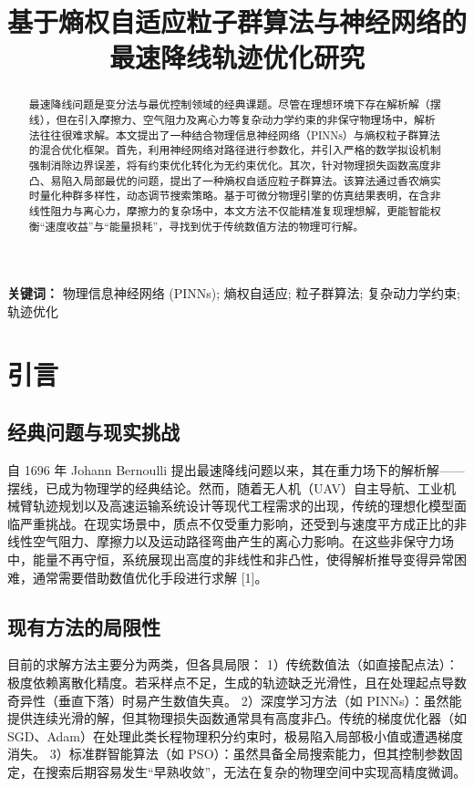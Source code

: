 \documentclass[twocolumn, UTF8, a4paper]{ctexart}
\title{\xiaosi \bfseries 基于熵权自适应粒子群算法与神经网络的最速降线轨迹优化研究}
\author{}
\date{}
\begin{document}
	
	\maketitle
	
	\begin{abstract}
		最速降线问题是变分法与最优控制领域的经典课题。尽管在理想环境下存在解析解（摆线），但在引入摩擦力、空气阻力及离心力等复杂动力学约束的非保守物理场中，解析法往往很难求解。本文提出了一种结合物理信息神经网络（PINNs）与熵权粒子群算法的混合优化框架。首先，利用神经网络对路径进行参数化，并引入严格的数学拟设机制强制消除边界误差，将有约束优化转化为无约束优化。其次，针对物理损失函数高度非凸、易陷入局部最优的问题，提出了一种熵权自适应粒子群算法。该算法通过香农熵实时量化种群多样性，动态调节搜索策略。基于可微分物理引擎的仿真结果表明，在含非线性阻力与离心力，摩擦力的复杂场中，本文方法不仅能精准复现理想解，更能智能权衡“速度收益”与“能量损耗”，寻找到优于传统数值方法的物理可行解。
	\end{abstract}
	
	\noindent \textbf{关键词：} 物理信息神经网络 (PINNs); 熵权自适应; 粒子群算法; 复杂动力学约束; 轨迹优化
	
	\section{引言}
	
	\subsection{经典问题与现实挑战}
	自 1696 年 Johann Bernoulli 提出最速降线问题以来，其在重力场下的解析解——摆线，已成为物理学的经典结论。然而，随着无人机（UAV）自主导航、工业机械臂轨迹规划以及高速运输系统设计等现代工程需求的出现，传统的理想化模型面临严重挑战。在现实场景中，质点不仅受重力影响，还受到与速度平方成正比的非线性空气阻力、摩擦力以及运动路径弯曲产生的离心力影响。在这些非保守力场中，能量不再守恒，系统展现出高度的非线性和非凸性，使得解析推导变得异常困难，通常需要借助数值优化手段进行求解 [1]。
	
	\subsection{现有方法的局限性}
	目前的求解方法主要分为两类，但各具局限：
	1）传统数值法（如直接配点法）：极度依赖离散化精度。若采样点不足，生成的轨迹缺乏光滑性，且在处理起点导数奇异性（垂直下落）时易产生数值失真。
	2）深度学习方法（如 PINNs）：虽然能提供连续光滑的解，但其物理损失函数通常具有高度非凸。传统的梯度优化器（如 SGD、Adam）在处理此类长程物理积分约束时，极易陷入局部极小值或遭遇梯度消失。
	3）标准群智能算法（如 PSO）：虽然具备全局搜索能力，但其控制参数固定，在搜索后期容易发生“早熟收敛”，无法在复杂的物理空间中实现高精度微调。
	
\end{document}
